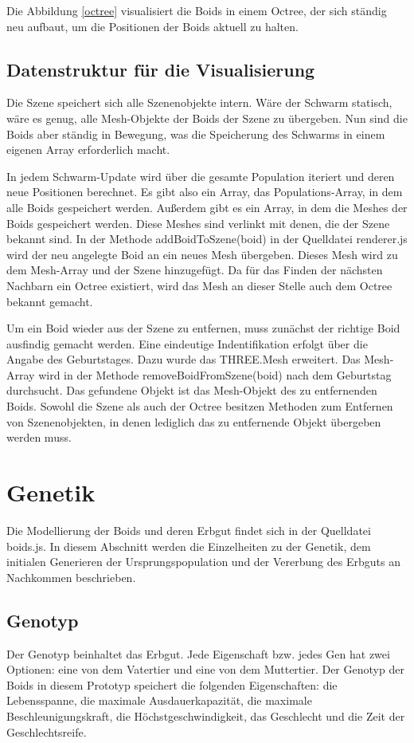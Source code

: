 \documentclass[draft=false
              ,paper=a4
              ,twoside=false
              ,fontsize=11pt
              ,headsepline
              ,BCOR10mm
              ,DIV11
              ,bibtotoc
              ,liststotoc
              ]{scrbook}
\begin{document}
Die Abbildung \ref{octree} visualisiert die Boids in einem Octree, der sich ständig neu aufbaut, um die Positionen der Boids aktuell zu halten.

\subsection{Datenstruktur für die Visualisierung}\label{visualstruktur}
Die Szene speichert sich alle Szenenobjekte intern. Wäre der Schwarm statisch, wäre es genug, alle Mesh-Objekte der Boids der Szene zu übergeben. Nun sind die Boids aber ständig in Bewegung, was die Speicherung des Schwarms in einem eigenen Array erforderlich macht.

In jedem Schwarm-Update wird über die gesamte Population iteriert und deren neue Positionen berechnet. Es gibt also ein Array, das Populations-Array, in dem alle Boids gespeichert werden. Außerdem gibt es ein Array, in dem die Meshes der Boids gespeichert werden. Diese Meshes sind verlinkt mit denen, die der Szene bekannt sind. In der Methode addBoidToSzene(boid) in der Quelldatei renderer.js wird der neu angelegte Boid an ein neues Mesh übergeben. Dieses Mesh wird zu dem Mesh-Array und der Szene hinzugefügt. Da für das Finden der nächsten Nachbarn ein Octree existiert, wird das Mesh an dieser Stelle auch dem Octree bekannt gemacht.

Um ein Boid wieder aus der Szene zu entfernen, muss zunächst der richtige Boid ausfindig gemacht werden. Eine eindeutige Indentifikation erfolgt über die Angabe des Geburtstages. Dazu wurde das THREE.Mesh erweitert. Das Mesh-Array wird in der Methode removeBoidFromSzene(boid) nach dem Geburtstag durchsucht. Das gefundene Objekt ist das Mesh-Objekt des zu entfernenden Boids. Sowohl die Szene als auch der Octree besitzen Methoden zum Entfernen von Szenenobjekten, in denen lediglich das zu entfernende Objekt übergeben werden muss.

\section{Genetik}
Die Modellierung der Boids und deren Erbgut findet sich in der Quelldatei boids.js. In diesem Abschnitt werden die Einzelheiten zu der Genetik, dem initialen Generieren der Ursprungspopulation und der Vererbung des Erbguts an Nachkommen beschrieben.

\subsection{Genotyp}
Der Genotyp beinhaltet das Erbgut. Jede Eigenschaft bzw. jedes Gen hat zwei Optionen: eine von dem Vatertier und eine von dem Muttertier. Der Genotyp der Boids in diesem Prototyp speichert die folgenden Eigenschaften: die Lebensspanne, die maximale Ausdauerkapazität, die maximale Beschleunigungskraft, die Höchstgeschwindigkeit, das Geschlecht und die Zeit der Geschlechtsreife.
\end{document}
